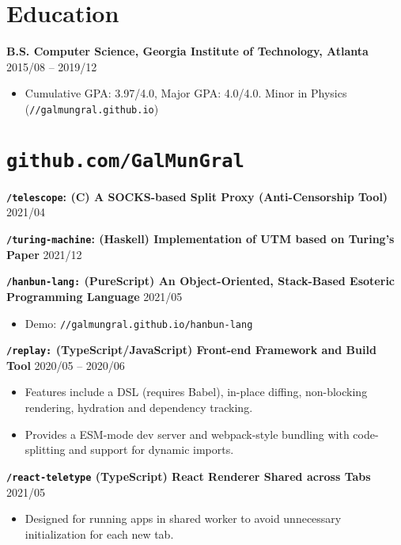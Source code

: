 \documentclass[10pt]{article}
\begin{document}
\section*{Education}
\textbf{B.S. Computer Science, Georgia Institute of Technology, Atlanta} \hfill 2015/08 -- 2019/12
\begin{itemize}
\item  Cumulative GPA: 3.97/4.0, Major GPA: 4.0/4.0. Minor in Physics (\texttt{//galmungral.github.io})
\end{itemize} 

\section*{\texttt{\large github.com/GalMunGral}}

\textbf{\texttt{/telescope}:  (C) A SOCKS-based Split Proxy (Anti-Censorship Tool)}   \hfill 2021/04

\vspace{0.5em}
\textbf{\texttt{/turing-machine}:  (Haskell) Implementation of UTM based on Turing's Paper} \hfill 2021/12

\vspace{0.5em}
\textbf{\texttt{/hanbun-lang:} (PureScript) An Object-Oriented, Stack-Based Esoteric Programming Language} \hfill 2021/05
\begin{itemize}
\item Demo: \texttt{//galmungral.github.io/hanbun-lang}
\end{itemize}

\vspace{0.5em}
\textbf{\texttt{/replay:} (TypeScript/JavaScript) Front-end Framework and Build Tool} \hfill 2020/05 -- 2020/06
\begin{itemize}
\item Features include a DSL (requires Babel), in-place diffing, non-blocking rendering, hydration and dependency tracking.
\item Provides a ESM-mode dev server and webpack-style bundling with code-splitting and support for dynamic imports.
\end{itemize}

\vspace{0.5em}
\textbf{\texttt{/react-teletype}  (TypeScript) React Renderer Shared across Tabs} \hfill 2021/05 
\begin{itemize}
\item Designed for running apps in shared worker to avoid unnecessary initialization for each new tab.
\end{itemize}
\end{document}
